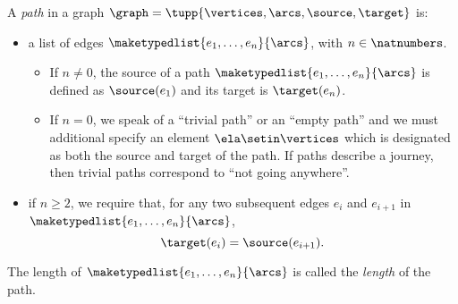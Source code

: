 \begin{definition}[Paths]
    \label{def:path}
    A \emph{path} in a graph $\graph=\tupp{\vertices,\arcs, \source,\target}$ is:

    \constit

    \begin{itemize}
        \item a list of edges $\maketypedlist{e_1, \dots, e_n}{\arcs}$, with $n \in \natnumbers$.
              \begin{itemize}
                  \item If $n \neq 0$, the source of a path $\maketypedlist{e_1, \dots, e_n}{\arcs}$ is defined as $\source(e_1)$ and its target is $\target(e_n)$.
                  \item If $n = 0$, we speak of a ``trivial path'' or an ``empty path'' and we must additional specify an element $\ela \setin \vertices$ which is designated as both the source and target of the path.
                        If paths describe a journey, then trivial paths correspond to ``not going anywhere''.
              \end{itemize}
    \end{itemize}

    \condit

    \begin{itemize}
        \item if $n \geq 2$, we require that, for any two subsequent edges $e_i$ and $e_{i+1}$ in $\maketypedlist{e_1, \dots, e_n}{\arcs}$,
              \begin{equation}
                  \target(e_i) = \source(e_{i+1}).
              \end{equation}
    \end{itemize}
    The length of $\maketypedlist{e_1, \dots, e_n}{\arcs}$ is called the \emph{length} of the path.
\end{definition}
